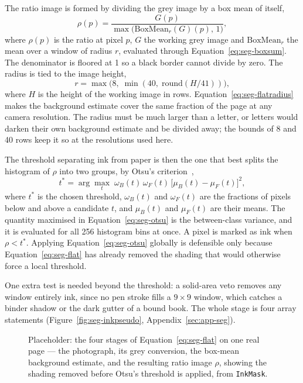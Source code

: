 The ratio image is formed by dividing the grey image by a box mean of itself,
\begin{equation}
\rho(p)=\frac{G(p)}{\max\bigl(\mathrm{BoxMean}_r(G)(p),\,1\bigr)},
\label{eq:seg-flat}
\end{equation}
where $\rho(p)$ is the ratio at pixel $p$, $G$ the working grey image and $\mathrm{BoxMean}_r$ the mean over a window of radius $r$, evaluated through Equation~\ref{eq:seg-boxsum}. The denominator is floored at 1 so a black border cannot divide by zero. The radius is tied to the image height,
\begin{equation}
r=\max\bigl(8,\;\min(40,\;\mathrm{round}(H/41))\bigr),
\label{eq:seg-flatradius}
\end{equation}
where $H$ is the height of the working image in rows. Equation~\ref{eq:seg-flatradius} makes the background estimate cover the same fraction of the page at any camera resolution. The radius must be much larger than a letter, or letters would darken their own background estimate and be divided away; the bounds of 8 and 40 rows keep it so at the resolutions used here.

The threshold separating ink from paper is then the one that best splits the histogram of $\rho$ into two groups, by Otsu's criterion~\cite[p.~63]{otsu1979},
\begin{equation}
t^*=\arg\max_t\;\omega_B(t)\,\omega_F(t)\,\bigl[\mu_B(t)-\mu_F(t)\bigr]^2 ,
\label{eq:seg-otsu}
\end{equation}
where $t^*$ is the chosen threshold, $\omega_B(t)$ and $\omega_F(t)$ are the fractions of pixels below and above a candidate $t$, and $\mu_B(t)$ and $\mu_F(t)$ are their means. The quantity maximised in Equation~\ref{eq:seg-otsu} is the between-class variance, and it is evaluated for all 256 histogram bins at once. A pixel is marked as ink when $\rho<t^*$. Applying Equation~\ref{eq:seg-otsu} globally is defensible only because Equation~\ref{eq:seg-flat} has already removed the shading that would otherwise force a local threshold.

One extra test is needed beyond the threshold: a solid-area veto removes any window entirely ink, since no pen stroke fills a $9\times9$ window, which catches a binder shadow or the dark gutter of a bound book. The whole stage is four array statements (Figure~\ref{fig:seg-inkpseudo}, Appendix~\ref{sec:app-seg}).

\begin{figure}[htb]
\centering
{}
\captionsetup{singlelinecheck=false,justification=justified}
\caption{Placeholder: the four stages of Equation~\ref{eq:seg-flat} on one real page --- the photograph, its grey conversion, the box-mean background estimate, and the resulting ratio image $\rho$, showing the shading removed before Otsu's threshold is applied, from \texttt{InkMask}.}
\label{fig:seg-flat-fig}
\end{figure}

